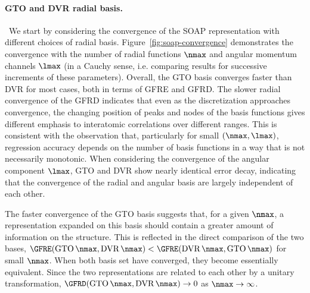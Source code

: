 \paragraph*{GTO and DVR radial basis.}\,
\label{sec:gto-dvr-comparison}
We start by considering the convergence of the SOAP representation with different choices of radial basis. Figure~\ref{fig:soap-convergence} demonstrates the convergence  with the number of radial functions $\nmax$ and angular momentum channels $\lmax$ (in a Cauchy sense, i.e. comparing results for successive increments of these parameters). Overall, the GTO basis converges faster than DVR for most cases, both in terms of GFRE and GFRD. 
The slower radial convergence of the GFRD indicates that even as the discretization approaches convergence, the changing position of peaks and nodes of the basis functions gives different emphasis to interatomic correlations over different ranges. This is consistent with the observation that, particularly for small $(\nmax, \lmax)$, regression accuracy depends on the number of basis functions in a way that is not necessarily monotonic.
When considering the convergence of the angular component $\lmax$, GTO and DVR show nearly identical error decay, indicating that the convergence of the radial and angular basis are largely independent of each other.
 
The faster convergence of the GTO basis suggests that, for a given $\nmax$, a representation expanded on this basis should contain a greater amount of information on the structure. This is reflected in the direct comparison of the two bases, $\GFRE(\text{GTO}\,\nmax,\text{DVR}\,\nmax)<\GFRE(\text{DVR}\,\nmax,\text{GTO}\,\nmax)$ for small $\nmax$.
When both basis set have converged, they become essentially equivalent. Since the two representations are related to each other by a unitary transformation,  $\GFRD(\text{GTO}\,\nmax,\text{DVR}\,\nmax)\rightarrow 0$ as $\nmax\rightarrow\infty$.

